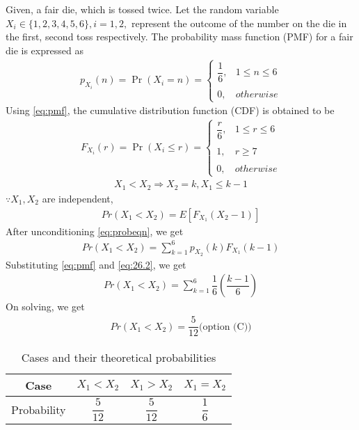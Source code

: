 Given, a fair die, which is tossed twice. Let the random variable $X_{i}\in\{1,2,3,4,5,6\},i=1,2,$ represent the outcome of the number on the die in the first, second toss respectively.  
The probability  mass function (PMF) for a fair die is expressed as \begin{align}
    \tag{26.1}
    \label{eq:pmf}
    p_{X_{i}}(n)=\Pr(X_{i}=n) = 
	\begin{cases}
	\dfrac{1}{6}, & 1\leq n\leq6 \\~\\[-1em]
	0, & otherwise
	\end{cases}
\end{align}
Using \eqref{eq:pmf}, the cumulative distribution function (CDF) is obtained to be
\begin{align}
    \tag{26.2}
    F_{X_{i}}(r)=\Pr(X_{i}\leq r) = 
	\begin{cases}
	\dfrac{r}{6}, & 1\leq r\leq6 \\~\\[-1em]
	1, & r \geq 7 \\~\\[-1em]
	0, & otherwise
	\end{cases}
	\label{eq:26.2}
\end{align}
\begin{align}
    \tag{26.3}
    X_{1}<X_{2}\Rightarrow X_{2}=k,X_{1}\leq k-1
\end{align}
$\because X_{1},X_{2}$ are independent,
\begin{align}
    \tag{26.4}
    Pr(X_{1}<X_{2})=E\left[F_{X_{1}}(X_{2}-1)\right]
    \label{eq:probeqn}
\end{align}
After unconditioning \eqref{eq:probeqn}, we get
\begin{align}
    \tag{26.5}
    Pr(X_{1}<X_{2})=\sum_{k=1}^{6}p_{X_{2}}(k) F_{X_{1}}(k-1)
\end{align}
Substituting \eqref{eq:pmf} and \eqref{eq:26.2}, we get
\begin{align}
    \tag{26.6}
    Pr(X_{1}<X_{2})=\sum_{k=1}^{6}\dfrac{1}{6}\left(\dfrac{k-1}{6} \right)
\end{align}
On solving, we get
\begin{align}
    \tag{26.7}
    Pr(X_{1}<X_{2})=\dfrac{5}{12}\text{(option (C))}
\end{align}
\begin{table}[h!]
\centering
\caption{Cases and their theoretical probabilities}
\label{table:1}
\begin{tabular}{|c||c|c|c|}
    \hline
    Case & $X_{1}<X_{2}$& $X_{1}>X_{2}$& $X_{1}=X_{2}$ \\
    \hline
    Probability & $\dfrac{5}{12}$ & $\dfrac{5}{12}$ & $\dfrac{1}{6}$\\[1ex]
    \hline
\end{tabular}
\end{table}